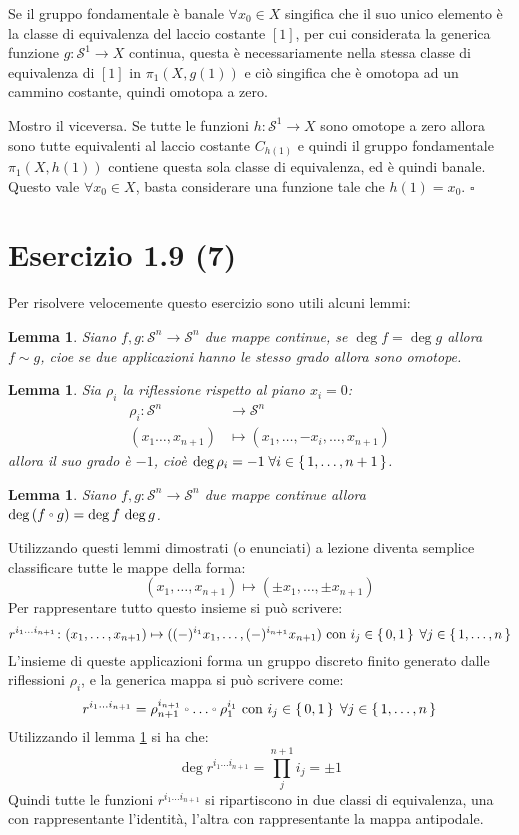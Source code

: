 \documentclass[10pt]{scrartcl}
\newcounter{lemmac}
\newtheorem{lemma}[lemmac]{Lemma}
\newcommand{\Sph}[1][]{\mathcal{S}^#1}
\let\latexcirc=\circ
\newcommand{\ccirc}{\mathbin{\mathchoice
  {\xcirc\scriptstyle}
  {\xcirc\scriptstyle}
  {\xcirc\scriptscriptstyle}
  {\xcirc\scriptscriptstyle}
}}
\newcommand{\xcirc}[1]{\vcenter{\hbox{$#1\latexcirc$}}}
\let\circ\ccirc
\begin{document}
Se il gruppo fondamentale è banale $ \forall x_0 \in X $ singifica che il suo unico elemento
è la classe di equivalenza del laccio costante $ [1] $, per cui considerata
la generica funzione $ g \colon \Sph{1} \to X $ continua, questa è necessariamente
nella stessa classe di equivalenza di $ [1] $ in $ \pi_1(X, g(1)) $ e ciò singifica
che è omotopa ad un cammino costante, quindi omotopa a zero.

Mostro il viceversa. Se tutte le funzioni $ h \colon \Sph{1} \to X $ sono omotope a zero
allora sono tutte equivalenti al laccio costante $ C_{h(1)} $ e quindi il gruppo
fondamentale $ \pi_1(X, h(1)) $ contiene questa sola classe di equivalenza, ed è
quindi banale. Questo vale $ \forall x_0 \in X $, basta considerare una funzione tale
che $ h(1) = x_0 $.
\hfill $ \square $

\section{Esercizio 1.9 (7)}
\label{esercizio:grado_sfere}
Per risolvere velocemente questo esercizio sono utili alcuni lemmi:
\begin{lemma}
  Siano $ f,g \colon \Sph{n} \to \Sph{n} $ due mappe continue, se
  $ \deg f = \deg g $ allora $ f \sim g $, cioe se due applicazioni
  hanno le stesso grado allora sono omotope.
\end{lemma}
\begin{lemma}
  Sia $ \rho_i $ la riflessione rispetto al piano $ x_i = 0 $:
  \begin{align*}
    \rho_i \colon \Sph{n} & \to \Sph{n} \\
    (x_1\dots, x_{n+1}) & \mapsto (x_1,\dots,-x_i, \dots, x_{n+1})
  \end{align*}
  allora il suo grado è $ -1 $, cioè $ \deg \rho_i = -1 \; \forall i \in \set{1, \dots, n+1} $.
\end{lemma}
\begin{lemma}
  \label{lemma:composizione_grado}
  Siano $ f,g \colon \Sph{n} \to \Sph{n} $ due mappe continue allora
  $ \deg {(f \circ g)} = \deg{f} \, \deg{g} $.
\end{lemma}
Utilizzando questi lemmi dimostrati (o enunciati) a lezione diventa
semplice classificare tutte le mappe della forma:
\[
  (x_1, \dots, x_{n+1}) \mapsto (\pm x_1, \dots, \pm x_{n+1})
\]
Per rappresentare tutto questo insieme si può scrivere:
\[
   r^{i_1\dots i_{n+1}} \colon (x_1, \dots, x_{n+1}) \mapsto ( (-)^{i_1} x_1, \dots, (-)^{i_{n+1}} x_{n+1}) \text{ con } i_j \in \set{0,1} \; \forall j \in \set{1,\dots, n}
\]
L'insieme di queste applicazioni forma un gruppo discreto finito
generato dalle riflessioni $ \rho_i $, e la generica mappa si può
scrivere come:
\[
  r^{i_1\dots i_{n+1}} = \rho_{n+1}^{i_{n+1}} \circ \dots \circ \rho_{1}^{i_{1}} \text{ con } i_j \in \set{0,1} \; \forall j \in \set{1,\dots, n}
\]
Utilizzando il lemma \ref{lemma:composizione_grado} si ha che:
\[
  \deg r^{i_1\dots i_{n+1}} = \prod_j^{n+1} i_{j} = \pm 1
\]
Quindi tutte le funzioni $ r^{i_1\dots i_{n+1}} $ si ripartiscono in
due classi di equivalenza, una con rappresentante l'identità,
l'altra con rappresentante la mappa antipodale.
\end{document}
